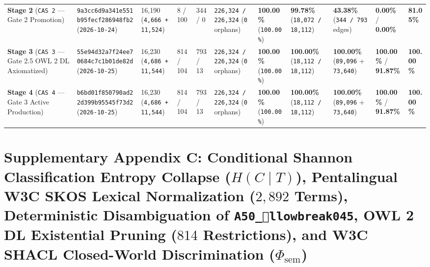 \documentclass[10pt,a4paper]{article}
\begin{document}
{\begin{longtable}{p{}p{}p{}p{}p{}p{}p{}p{}p{}p{}p{}}
\textbf{Stage 2} (\texttt{CAS 2} --- Gate 2 Promotion) & \texttt{9a3cc6d9a341e551b95fecf286948fb2} (\texttt{2026-10-24}) & 16,190 (\texttt{4,666 + 11,524}) & 8 / 100 & 344 / 0 & \texttt{226,324 / 226,324} (\texttt{0} orphans) & \textbf{100.00\%} (\texttt{100.00\%}) & \textbf{99.78\%} (\texttt{18,072 / 18,112}) & \textbf{43.38\%} (\texttt{344 / 793} edges) & \textbf{0.00\%} / \textbf{0.00\%} & \textbf{81.05\%} \\
\textbf{Stage 3} (\texttt{CAS 3} --- Gate 2.5 OWL 2 DL Axiomatized) & \texttt{55e94d32a7f24ee70684c7c1b01de82d} (\texttt{2026-10-25}) & 16,230 (\texttt{4,686 + 11,544}) & 814 / 104 & 793 / 13 & \texttt{226,324 / 226,324} (\texttt{0} orphans) & \textbf{100.00\%} (\texttt{100.00\%}) & \textbf{100.00\%} (\texttt{18,112 / 18,112}) & \textbf{100.00\%} (\texttt{89,096} + \texttt{73,640}) & \textbf{100.00\%} / \textbf{91.87\%} & \textbf{100.00\%} \\
\textbf{Stage 4} (\texttt{CAS 4} --- Gate 3 Active Production) & \texttt{b6bd01f850790ad22d399b95545f73d2} (\texttt{2026-10-25}) & 16,230 (\texttt{4,686 + 11,544}) & 814 / 104 & 793 / 13 & \texttt{226,324 / 226,324} (\texttt{0} orphans) & \textbf{100.00\%} (\texttt{100.00\%}) & \textbf{100.00\%} (\texttt{18,112 / 18,112}) & \textbf{100.00\%} (\texttt{89,096} + \texttt{73,640}) & \textbf{100.00\%} / \textbf{91.87\%} & \textbf{100.00\%} \\
\bottomrule
\end{longtable}
}



\section*{Supplementary Appendix C: Conditional Shannon Classification Entropy Collapse ($H(C \mid T)$), Pentalingual W3C SKOS Lexical Normalization ($2,892$ Terms), Deterministic Disambiguation of \texttt{A50\_llowbreak{}045}, OWL 2 DL Existential Pruning ($814$ Restrictions), and W3C SHACL Closed-World Discrimination ($\Phi_{\text{sem}}$)}
\end{document}
